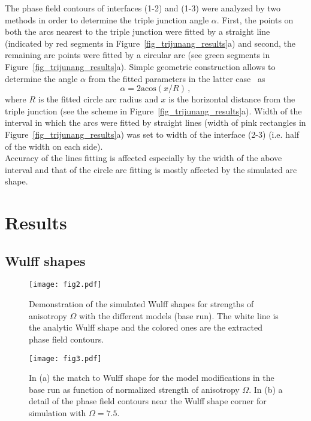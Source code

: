 The phase field contours of interfaces (1-2) and (1-3) were analyzed by two methods in order to determine the triple junction angle $\alpha$. First, the points on both the arcs nearest to the triple junction were fitted by a straight line (indicated by red segments in Figure~\ref{fig_trijunang_results}a) and second, the remaining arc points were fitted by a circular arc (see green segments in Figure~\ref{fig_trijunang_results}a). Simple geometric construction allows to determine the angle $\alpha$ from the fitted parameters in the latter case~\cite{Moelans2009} as
\begin{equation}
	\alpha = 2\mathrm{acos}(x/R)\,,
\end{equation}
where $R$ is the fitted circle arc radius and $x$ is the horizontal distance from the triple junction (see the scheme in Figure~\ref{fig_trijunang_results}a). Width of the interval in which the arcs were fitted by straight lines (width of pink rectangles in Figure~\ref{fig_trijunang_results}a) was set to width of the interface (2-3) (i.e. half of the width on each side).\\
Accuracy of the lines fitting is affected especially by the width of the above interval and that of the circle arc fitting is mostly affected by the simulated arc shape.

\section{Results}
\label{sec_Results}

\subsection{Wulff shapes}
\begin{figure}
	\centering
	\texttt{[image: fig2.pdf]}
	\caption{Demonstration of the simulated Wulff shapes for strengths of anisotropy $\Omega$ with the different models (base run). The white line is the analytic Wulff shape and the colored ones are the extracted phase field contours.}
	\label{fig_wulff_demo_shapes}
\end{figure}

\begin{figure}[]
	\centering
	\texttt{[image: fig3.pdf]}
	\caption{In (a) the match to Wulff shape for the model modifications in the base run as function of normalized strength of anisotropy $\Omega$. In (b) a detail of the phase field contours near  the Wulff shape corner for simulation with $\Omega=7.5$.}
	\label{fig_wulff_match}
\end{figure}

